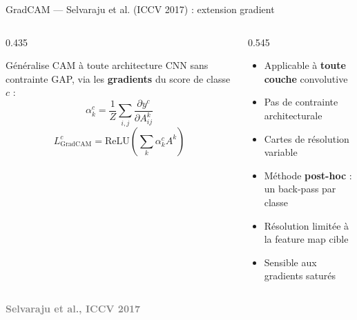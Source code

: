 \documentclass[10pt]{beamer}
\newcommand{\source}[1]{\vspace{6pt}\hfill{\textcolor{gray}{\textbf{\tiny #1}}}}
\begin{document}
\begin{frame}{GradCAM --- Selvaraju et al. (ICCV 2017) : extension gradient}
  \begin{columns}
    \begin{column}{0.435\textwidth}
      \begin{tcolorbox}[
        colback=blue!3, colframe=blue!40!black,
        arc=2mm, boxrule=0.5pt, fonttitle=\bfseries,
        title={Contribution}]
        Généralise CAM à toute architecture CNN sans contrainte GAP,
        via les \textbf{gradients} du score de classe $c$ :
        \[
          \alpha_k^c = \frac{1}{Z} \sum_{i,j} \frac{\partial y^c}{\partial A^k_{ij}}
        \]
        \[
          L^c_{\text{GradCAM}} = \text{ReLU}\!\left(\sum_k \alpha_k^c A^k\right)
        \]
      \end{tcolorbox}
    \end{column}
    \begin{column}{0.545\textwidth}
      \begin{tcolorbox}[
        colback=green!3, colframe=green!40!black,
        arc=2mm, boxrule=0.5pt, fonttitle=\bfseries,
        title={Avantages vs CAM}]
        \begin{itemize}
          \item Applicable à \textbf{toute couche} convolutive
          \item Pas de contrainte architecturale
          \item Cartes de résolution variable
        \end{itemize}
      \end{tcolorbox}
      \begin{tcolorbox}[
        colback=red!3, colframe=red!60!black,
        arc=2mm, boxrule=0.5pt, fonttitle=\bfseries,
        title={Limites persistantes}]
        \begin{itemize}
          \item Méthode \textbf{post-hoc} : un back-pass par classe
          \item Résolution limitée à la feature map cible
          \item Sensible aux gradients saturés
        \end{itemize}
      \end{tcolorbox}
    \end{column}
  \end{columns}
  \source{Selvaraju et al., ICCV 2017}
\end{frame}
\end{document}
